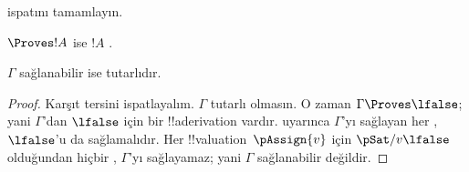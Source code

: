 \begin{prob}
   ispatını tamamlayın.
\end{prob}
\tagendprob

\begin{cor}
$\Proves !A$ ise $!A$ .
\end{cor}

\begin{cor}
$\Gamma$ sağlanabilir ise tutarlıdır.
\end{cor}

\begin{proof}
Karşıt tersini ispatlayalım. $\Gamma$ tutarlı olmasın. O zaman
$\Gamma \Proves \lfalse$; yani $\Gamma$'dan $\lfalse$ için bir
!!a{derivation} vardır.  uyarınca $\Gamma$'yı sağlayan
her ,
$\lfalse$'u da sağlamalıdır. Her
{!!{valuation}~$\pAssign{v}$ için $\pSat/{v}{\lfalse}$} olduğundan hiçbir
, $\Gamma$'yı sağlayamaz; yani
$\Gamma$ sağlanabilir değildir.
\end{proof}

